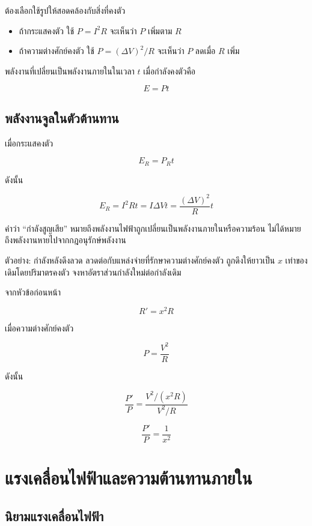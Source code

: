 ต้องเลือกใช้รูปให้สอดคล้องกับสิ่งที่คงตัว

\begin{itemize}
    \item ถ้ากระแสคงตัว ใช้ $P=I^2R$ จะเห็นว่า $P$ เพิ่มตาม $R$
    \item ถ้าความต่างศักย์คงตัว ใช้ $P=(\Delta V)^2/R$ จะเห็นว่า $P$ ลดเมื่อ $R$ เพิ่ม
\end{itemize}

พลังงานที่เปลี่ยนเป็นพลังงานภายในในเวลา $t$ เมื่อกำลังคงตัวคือ

\[
\boxed{E=Pt}
\]

\subsection{พลังงานจูลในตัวต้านทาน}

เมื่อกระแสคงตัว

\[
E_R=P_Rt
\]

ดังนั้น

\[
\boxed{E_R=I^2Rt=I\Delta Vt=\frac{(\Delta V)^2}{R}t}
\]

คำว่า ``กำลังสูญเสีย'' หมายถึงพลังงานไฟฟ้าถูกเปลี่ยนเป็นพลังงานภายในหรือความร้อน ไม่ได้หมายถึงพลังงานหายไปจากกฎอนุรักษ์พลังงาน

\begin{examplebox}{ตัวอย่าง: กำลังหลังดึงลวด}
ลวดต่อกับแหล่งจ่ายที่รักษาความต่างศักย์คงตัว ถูกดึงให้ยาวเป็น $x$ เท่าของเดิมโดยปริมาตรคงตัว จงหาอัตราส่วนกำลังใหม่ต่อกำลังเดิม

จากหัวข้อก่อนหน้า

\[
R'=x^2R
\]

เมื่อความต่างศักย์คงตัว

\[
P=\frac{V^2}{R}
\]

ดังนั้น

\[
\frac{P'}{P}
=\frac{V^2/(x^2R)}{V^2/R}
\]

\[
\boxed{\frac{P'}{P}=\frac{1}{x^2}}
\]
\end{examplebox}

\section{แรงเคลื่อนไฟฟ้าและความต้านทานภายใน}

\subsection{นิยามแรงเคลื่อนไฟฟ้า}

